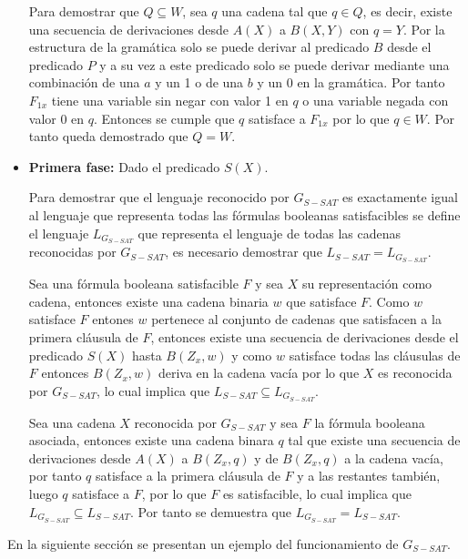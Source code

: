 \documentclass[12pt]{article}
\begin{document}
\begin{itemize}
          Para demostrar que $Q\subseteq W$, sea $q$ una cadena tal que $q\in Q$, es decir, existe una secuencia de derivaciones
          desde $A(X)$ a $B(X,Y)$ con $q=Y$. Por la estructura de la gramática solo se puede derivar al predicado $B$ desde el predicado
          $P$ y a su vez a este predicado solo se puede derivar mediante una combinación de una $a$ y un 1 o de una $b$ y un 0 en la gramática. Por tanto
          $F_{1x}$ tiene una variable sin negar con valor 1 en $q$ o una variable negada con valor 0 en $q$. Entonces se cumple que $q$ satisface
          a $F_{1x}$ por lo que $q\in W$. Por tanto queda demostrado que $Q=W$.

    \item \textbf{Primera fase:} Dado el predicado $S(X)$.

          Para demostrar que el lenguaje reconocido por $G_{S-SAT}$ es exactamente igual al lenguaje que representa
          todas las fórmulas booleanas satisfacibles se define el lenguaje $L_{G_{S-SAT}}$ que representa
          el lenguaje de todas las cadenas reconocidas por $G_{S-SAT}$, es necesario demostrar que $L_{S-SAT}=L_{G_{S-SAT}}$.

          Sea una fórmula booleana satisfacible $F$ y sea $X$ su representación como cadena, entonces existe una cadena binaria
          $w$ que satisface $F$. Como $w$ satisface $F$ entones $w$ pertenece al conjunto de cadenas que satisfacen a la primera cláusula de $F$,
          entonces existe una secuencia de derivaciones desde el predicado $S(X)$ hasta $B(Z_x,w)$ y como $w$ satisface todas las cláusulas de $F$
          entonces $B(Z_x,w)$ deriva en la cadena vacía por lo que $X$ es reconocida por $G_{S-SAT}$, lo cual implica que $L_{S-SAT}\subseteq L_{G_{S-SAT}}$.

          Sea una cadena $X$ reconocida por $G_{S-SAT}$ y sea $F$ la fórmula booleana asociada, entonces existe una cadena binara $q$ tal que existe una secuencia
          de derivaciones desde $A(X)$ a $B(Z_x,q)$ y de $B(Z_x,q)$ a la cadena vacía, por tanto $q$ satisface a la primera cláusula de $F$
          y a las restantes también, luego $q$ satisface a $F$, por lo que $F$ es satisfacible, lo cual implica que $L_{G_{S-SAT}}\subseteq L_{S-SAT}$.
          Por tanto se demuestra que $L_{G_{S-SAT}}= L_{S-SAT}$.

\end{itemize}

En la siguiente sección se presentan un ejemplo del funcionamiento de $G_{S-SAT}$.
\end{document}
